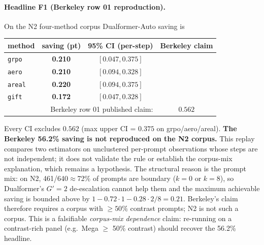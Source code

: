\paragraph{Headline F1 (Berkeley row 01 reproduction).}
On the N2 four-method corpus Dualformer-Auto saving is
\begin{center}
\begin{tabular}{lccc}
\toprule
method & saving (pt) & 95\% CI (per-step) & Berkeley claim \\
\midrule
\texttt{grpo}  & \textbf{0.210} & $[0.047, 0.375]$ &  \\
\texttt{aero}  & \textbf{0.210} & $[0.094, 0.328]$ &  \\
\texttt{areal} & \textbf{0.220} & $[0.094, 0.375]$ &  \\
\texttt{gift}  & \textbf{0.172} & $[0.047, 0.328]$ &  \\
\midrule
\multicolumn{3}{r}{Berkeley row 01 published claim:} & $0.562$ \\
\bottomrule
\end{tabular}
\end{center}
Every CI excludes $0.562$ (max upper CI = $0.375$ on grpo/aero/areal).
\textbf{The Berkeley 56.2\% saving is not reproduced on the N2 corpus.}
This replay compares two estimators on unclustered per-prompt
observations whose steps are not independent; it does not validate the
rule or establish the corpus-mix explanation, which remains a
hypothesis.
The structural reason is the prompt mix: on N2, 461/640$\approx$72\%
of prompts are boundary ($k{=}0$ or $k{=}8$), so Dualformer's
$G'{=}2$ de-escalation cannot help them and the maximum achievable
saving is bounded above by $1 - 0.72 \cdot 1 - 0.28 \cdot 2/8 = 0.21$.
Berkeley's claim therefore requires a corpus with $\geq 50\%$
contrast prompts; N2 is not such a corpus. This is a falsifiable
\emph{corpus-mix dependence} claim: re-running on a contrast-rich
panel (e.g.\ Mega $\geq$ 50\% contrast) should recover the 56.2\%
headline.

